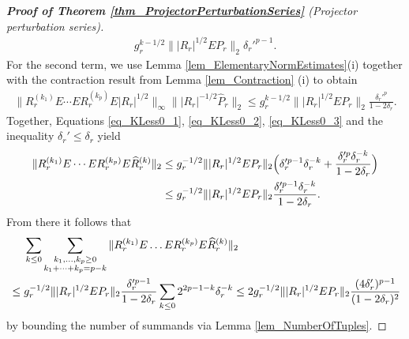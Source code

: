 \documentclass[a4paper,11pt]{article} %
\numberwithin{equation}{section}
\theoremstyle{definition}
\theoremstyle{remark}
\theoremstyle{plain}
\begin{document}
\begin{proof}[\normalfont \textbf{Proof of Theorem \ref{thm_ProjectorPerturbationSeries}} (Projector perturbation series)]
\begin{align}
          g_{r}^{k - 1/2} 
          \| | R_{r} |^{1/2} E P_{r} \|_{2} \delta_{r}'^{p - 1}. 
  \end{align}
  For the second term, we use Lemma \ref{lem_ElementaryNormEstimates}(i) together
  with the contraction result from Lemma \ref{lem_Contraction} (i) to obtain
  \begin{align}
    \label{eq_KLess0_3} 
          \| R_{r}^{ ( k_{1} ) } E \cdots E R_{r}^{ ( k_{p} ) } E 
             | R_{r} |^{1/2}
          \|_{\infty} 
          \|  | R_{r} |^{-1/2} \widehat{P}_{r} \|_{2}
    \le 
          g_{r}^{k - 1/2} 
          \| | R_{r} |^{1/2} E P_{r} \|_{2} 
          \frac{ \delta_{r}'^{p} }{ 1 - 2 \delta_{r} }.
  \end{align}
  Together, Equations \eqref{eq_KLess0_1},
  \eqref{eq_KLess0_2}, \eqref{eq_KLess0_3} and the inequality $\delta_r'\leq \delta_r$ yield
  \begin{align}
        \| R_{r}^{ ( k_{1} ) } E \cdots E R_{r}^{ ( k_{p} ) } 
           E \widehat{R}_{r}^{ (k) }
        \|_{2} 
    & \le 
        g_{r}^{ -1/2 } \| | R_{r} |^{1/2} E P_{r} \|_{2} 
        \Big( \delta_{r}'^{ p - 1 } \delta_{r}^{ - k } 
            + 
              \frac{ \delta_{r}'^{p} \delta_{r}^{-k} }{ 1 - 2 \delta_{r} }
        \Big) 
        \notag
    \\
    & \leq  
        g_{r}^{ -1/2 } \| | R_{r} |^{1/2} E P_{r} \|_{2} 
        \frac{ \delta_{r}'^{p - 1} \delta_{r}^{-k} }{ 1 - 2 \delta_{r} }.
    \notag
  \end{align}
  From there it follows that
  \begin{align}
    \label{eq_KLess0_4}
    & \ \ \ \
            \sum_{k \le 0} 
            \sum_{ \substack{ k_{1}, \dots, k_{p} \ge 0 \\
                              k_{1} + \dots + k_{p} = p - k 
                            }
                 } 
            \| R_{r}^{ ( k_{1} ) } E \dots E R_{r}^{ ( k_{p} ) } 
               E \widehat{R}_{r}^{ (k) } 
            \|_{2} 
    \\
    & \le 
            g_{r}^{-1/2} \| | R_{r} |^{1/2} E P_{r} \|_{2} 
            \frac{ \delta_{r}'^{p - 1}}{ 1 - 2 \delta_{r} }
            \sum_{k \le 0} 
            2^{2 p - 1 - k} \delta_{r}^{-k}
    \notag 
    \le 
            2 g_{r}^{-1/2} \| | R_{r} |^{1/2} E P_{r} \|_{2} 
            \frac{ ( 4 \delta_{r}' )^{p - 1} }{ ( 1 - 2 \delta_{r} )^{2} }
    \notag
  \end{align}
  by bounding the number of summands via Lemma \ref{lem_NumberOfTuples}.


\end{proof}
\end{document}
